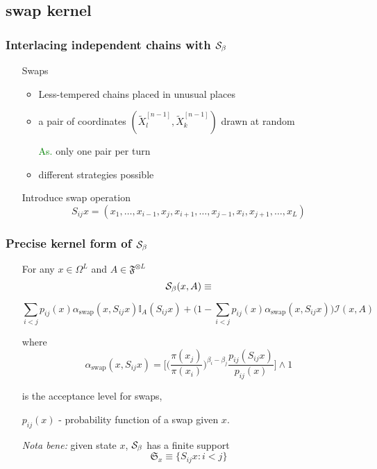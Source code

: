 		\subsection{swap kernel}

\begin{frame}
		\frametitle{ Interlacing independent chains with $\mathcal{S}_{\beta}$}

	\begin{itemize}
		\item[] Swaps
		\begin{itemize}
			\item Less-tempered chains placed in unusual places
			\item a pair of coordinates $(\widetilde{X}^{[n-1]}_l, \widetilde{X}^{[n-1]}_k)$ drawn at random
			\item[\textcolor{green}{As.}] only one pair per turn
			\item different strategies possible 
		\end{itemize}

		\item[] 
		\item[]	Introduce swap operation 
		$$S_{ij} x = (x_1, \dots, x_{i-1}, x_j, x_{i+1}, \dots, x_{j-1}, x_i, x_{j+1}, \dots, x_L)$$
	\end{itemize}

\end{frame}

\begin{frame}
		\frametitle{ Precise kernel form of $\mathcal{S}_{\beta}$}

	\begin{itemize}
		\item[] For any $x \in \Omega^L$ and $A \in \mathfrak{F}^{\otimes L}$ 
	$$\mathcal{S}_{\beta}(x, A) \equiv$$
		\item[]
$$\underset{ i < j}{\sum} p_{ij}(x) \alpha_\text{swap} (x, S_{ij}x) \mathbb{I}_A(S_{ij} x) + \Big( 1 - \underset{ i < j}{\sum} p_{ij}(x) \alpha_\text{swap} (x, S_{ij}x)\Big) \mathcal{I}(x,A)$$

		\item[] where 
$$\alpha_\text{swap}(x,S_{ij} x) = \Big[  \Big(\frac{\pi(x_j)}{\pi(x_i)} \Big)^{\beta_i - \beta_j}  \frac{ p_{ij}(S_{ij} x )}{ p_{ij}( x ) }\Big] \wedge 1$$
		\item[] is the acceptance level for swaps, 
		\item[] $p_{ij}( x )$ - probability function of a swap given $x$. 
		\item[] \emph{Nota bene:} given state $x$, $\mathcal{S}_{\beta}$ has a finite support 
	$$\mathfrak{S}_x \equiv\{ S_{ij} x : i <j \}$$
	\end{itemize}

\end{frame}


